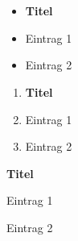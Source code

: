 \documentclass[17pt,a4paper,extrafontsizes,twoside,showtrims,openright]{memoir}
\begin{document}
\raggedright
\mainmatter
\pagestyle{Ruled}
\chapter*{\ }
\begin{itemize}
\item \textbf{Titel}
\item Eintrag 1
\item Eintrag 2
\end{itemize}
\begin{enumerate}[1.]
\item \textbf{Titel}
\item Eintrag 1
\item Eintrag 2
\end{enumerate}
\begin{trivlist}
\item \textbf{Titel}
\item Eintrag 1
\item Eintrag 2
\end{trivlist}
\end{document}
